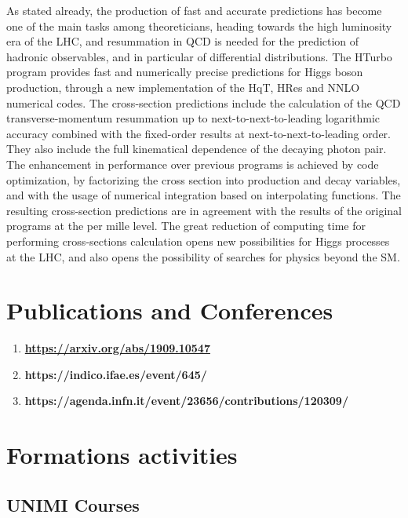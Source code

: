 \documentclass[12pt]{article}
\begin{document}
As stated already, the production of fast and accurate predictions has become one of the main tasks among theoreticians, heading towards the high luminosity era of the LHC, and resummation in QCD is needed for the prediction of hadronic observables, and in particular of differential distributions. The HTurbo program provides fast and numerically precise predictions for Higgs boson production, through a new implementation of the HqT, HRes and NNLO numerical codes. The cross-section predictions include the calculation of the QCD transverse-momentum resummation up to next-to-next-to-leading logarithmic accuracy combined with the fixed-order results at next-to-next-to-leading order. They also include the full kinematical dependence of the decaying photon pair. The enhancement in performance over previous programs is achieved by code optimization, by factorizing the cross section into production and decay variables, and with the usage of numerical integration based on interpolating functions. The resulting cross-section predictions are in agreement with the results of the original programs at the per mille level. The great reduction of computing time for performing cross-sections calculation opens new possibilities for Higgs processes at the LHC, and also opens the possibility of searches for physics beyond the SM.
\newpage

\section{Publications and Conferences}

\begin{enumerate}{\leftmargin 15pt \itemsep 0pt \topsep 3pt}
	\item{\bf \href{https://arxiv.org/abs/1909.10547}{https://arxiv.org/abs/1909.10547}}
	\item{\bf https://indico.ifae.es/event/645/}
	\item{\bf https://agenda.infn.it/event/23656/contributions/120309/}
\end{enumerate}

\section{Formations activities}

\subsection{UNIMI Courses}
\end{document}
